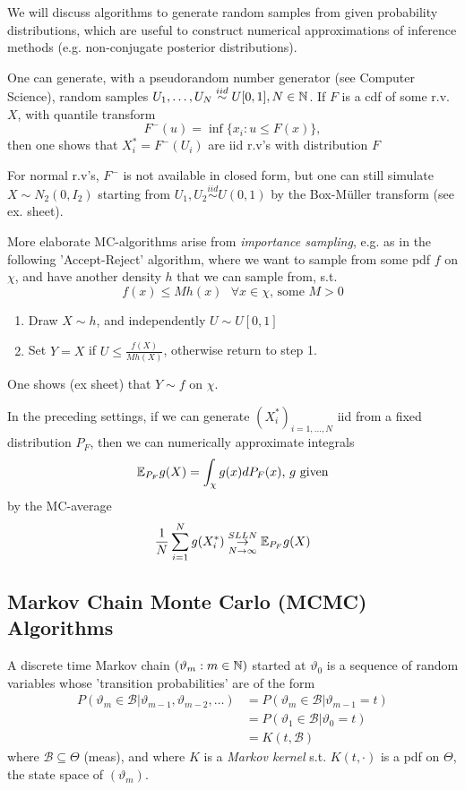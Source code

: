 \documentclass[a4paper]{article}
\begin{document}
We will discuss algorithms to generate random samples from given probability distributions, which are useful to construct numerical approximations of inference methods (e.g. non-conjugate posterior distributions).

One can generate, with a pseudorandom number generator (see Computer Science), random samples $U_1, \ldots, U_N \stackrel{iid}{\sim} U[0,1], N \in \mathbb{N}$. If $F$ is a cdf of some r.v. $X$, with quantile transform 
\[
	F^{-}(u) = \inf \{x_i : u \le F(x)\} 
,\]
then one shows that $X_i^{\ast} = F^{-} (U_i)$ are iid r.v's with distribution $F$

For normal r.v's, $F^{-}$ is not available in closed form, but one can still simulate $X \sim N_2 (0, I_2)$ starting from $U_1, U_2 \stackrel{iid}{\sim} U(0,1)$ by the Box-M{\"u}ller transform (see ex. sheet).

More elaborate MC-algorithms arise from \textit{importance sampling}, e.g. as in the following 'Accept-Reject' algorithm, where we want to sample from some pdf $f$ on $\chi$, and have another density $h$ that we can sample from, s.t. 
\[
	f(x) \le Mh(x) \text{  } \forall x \in \chi \text{, some } M>0
\] 

\begin{enumerate}
	\item Draw $X \sim h$, and independently $U \sim U[0,1]$
	\item Set $Y=X$ if $U \le \frac{f(X)}{M h(X)}$, otherwise return to step 1.
\end{enumerate}

One shows (ex sheet) that $Y \sim f$ on $\chi$.

In the preceding settings, if we can generate $\left(X_i^{\ast}\right)_{i = 1,\ldots,N}$ iid from a fixed distribution $P_F$, then we can numerically approximate integrals 
\[
	\mathbb{E}_{P_F} g(X) = \int_{\chi} g(x) dP_F(x) \text{, $g$ given}
\] 
by the MC-average
\[
	\frac{1}{N} \sum_{i=1}^{N} g(X_i^{\ast}) \underset{N\to \infty}{\overset{SLLN}{\to }} \mathbb{E}_{P_F} g(X)
\] 

\subsection{Markov Chain Monte Carlo (MCMC) Algorithms}

A discrete time Markov chain $(\vartheta_m : m\in \mathbb{N})$ started at $\vartheta_0$ is a sequence of random variables whose 'transition probabilities' are of the form
\begin{align*}
P\left( \vartheta_m \in \mathcal{B} | \vartheta_{m-1}, \vartheta_{m-2}, \ldots \right) &= P\left( \vartheta_m \in \mathcal{B} | \vartheta_{m-1} = t \right) \\
&= P\left( \vartheta_1 \in \mathcal{B} | \vartheta_0 = t \right) \\
&= K(t,\mathcal{B})
\end{align*}
where $\mathcal{B} \subseteq \Theta$ (meas), and where $K$ is a \textit{Markov kernel} s.t. $K(t, \cdot )$ is a pdf on $\Theta$, the state space of $(\vartheta_m)$.
\end{document}
